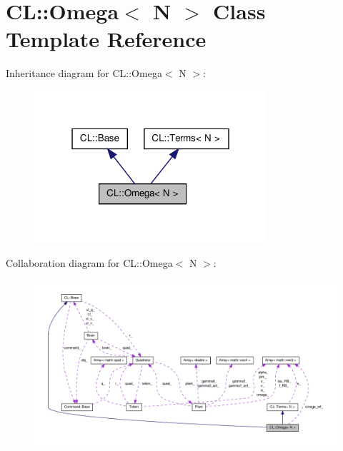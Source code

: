 \hypertarget{classCL_1_1Omega}{\section{\-C\-L\-:\-:\-Omega$<$ \-N $>$ \-Class \-Template \-Reference}
\label{classCL_1_1Omega}
}


\-Inheritance diagram for \-C\-L\-:\-:\-Omega$<$ \-N $>$\-:\nopagebreak
\begin{figure}[H]
\begin{center}
\leavevmode
\includegraphics[width=244pt]{classCL_1_1Omega__inherit__graph}
\end{center}
\end{figure}


\-Collaboration diagram for \-C\-L\-:\-:\-Omega$<$ \-N $>$\-:\nopagebreak
\begin{figure}[H]
\begin{center}
\leavevmode
\includegraphics[width=350pt]{classCL_1_1Omega__coll__graph}
\end{center}
\end{figure}
